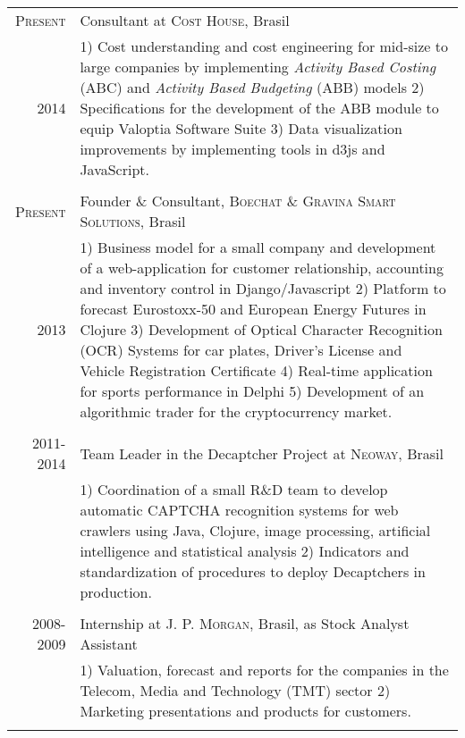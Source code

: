 \documentclass[a4paper,10pt]{article} %
\begin{document}
\begin{tabular}{r|p{11cm}}
  \textsc{Present} &
  Consultant at \textsc{Cost House}, Brasil \\
  \textsc{2014} &
  \footnotesize{
  1) Cost understanding and cost
  engineering for mid-size to large companies by implementing \textit{Activity Based
  Costing} (ABC) and \textit{Activity Based Budgeting} (ABB) models
  2) Specifications for the development of the ABB module to equip Valoptia Software
  Suite
  3) Data visualization improvements by implementing tools in d3js and JavaScript. }\\
\multicolumn{2}{c}{} \\


\textsc{Present} &
Founder \& Consultant, \textsc{Boechat \&  Gravina Smart Solutions}, Brasil \\
\textsc{2013} &
\footnotesize{
  1) Business model for a small company and
  development of a web-application for
  customer relationship, accounting and inventory control in
  Django/Javascript
  2) Platform to forecast Eurostoxx-50 and European Energy Futures in
  Clojure
  3) Development of Optical Character Recognition (OCR) Systems for
  car plates, Driver's License and Vehicle Registration Certificate
  4) Real-time application for sports performance in Delphi
  5) Development of an algorithmic trader for the
  cryptocurrency market. 
  }
\\
\multicolumn{2}{c}{} \\


\textsc{2011-2014} &
Team Leader in the Decaptcher Project at
\textsc{Neoway}, Brasil \\
& \footnotesize{
  1) Coordination of a small R\&D team to develop automatic
  CAPTCHA recognition systems for web crawlers using Java, Clojure,
  image processing, artificial intelligence and statistical analysis
  2) Indicators and standardization of procedures to deploy Decaptchers in production. } \\
\multicolumn{2}{c}{} \\


\textsc{2008-2009} &
Internship at \textsc{J. P. Morgan}, Brasil, as Stock Analyst Assistant \\
& \footnotesize{
  1) Valuation, forecast and reports for the companies in the Telecom,
  Media and Technology (TMT) sector
  2) Marketing presentations and products for customers.}\\
\multicolumn{2}{c}{} \\


\end{tabular}
\end{document}
